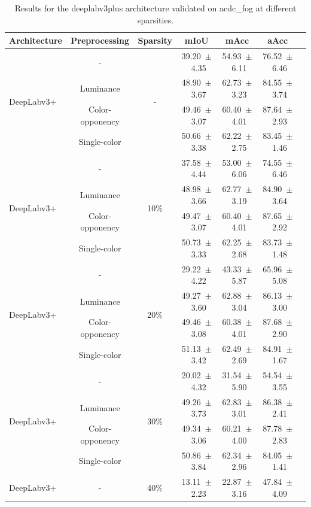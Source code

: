 \begin{table}[h]
\centering
\caption{Results for the deeplabv3plus architecture validated on acdc_fog at different sparsities.}
\begin{tabular}{@{}lccc ccc@{}}
\toprule
Architecture & Preprocessing & Sparsity & mIoU & mAcc & aAcc \\
\midrule

\multirow{4}{*}{DeepLabv3+} & - & \multirow{4}{*}{-} & 39.20~$\pm$~4.35 & 54.93~$\pm$~6.11 & 76.52~$\pm$~6.46 \\
& Luminance & & 48.90~$\pm$~3.67 & 62.73~$\pm$~3.23 & 84.55~$\pm$~3.74 \\
& Color-opponency & & 49.46~$\pm$~3.07 & 60.40~$\pm$~4.01 & 87.64~$\pm$~2.93 \\
& Single-color & & 50.66~$\pm$~3.38 & 62.22~$\pm$~2.75 & 83.45~$\pm$~1.46 \\
\midrule
\multirow{4}{*}{DeepLabv3+} & - & \multirow{4}{*}{10\%} & 37.58~$\pm$~4.44 & 53.00~$\pm$~6.06 & 74.55~$\pm$~6.46 \\
& Luminance & & 48.98~$\pm$~3.66 & 62.77~$\pm$~3.19 & 84.90~$\pm$~3.64 \\
& Color-opponency & & 49.47~$\pm$~3.07 & 60.40~$\pm$~4.01 & 87.65~$\pm$~2.92 \\
& Single-color & & 50.73~$\pm$~3.33 & 62.25~$\pm$~2.68 & 83.73~$\pm$~1.48 \\
\midrule
\multirow{4}{*}{DeepLabv3+} & - & \multirow{4}{*}{20\%} & 29.22~$\pm$~4.22 & 43.33~$\pm$~5.87 & 65.96~$\pm$~5.08 \\
& Luminance & & 49.27~$\pm$~3.60 & 62.88~$\pm$~3.04 & 86.13~$\pm$~3.00 \\
& Color-opponency & & 49.46~$\pm$~3.08 & 60.38~$\pm$~4.01 & 87.68~$\pm$~2.90 \\
& Single-color & & 51.13~$\pm$~3.42 & 62.49~$\pm$~2.69 & 84.91~$\pm$~1.67 \\
\midrule
\multirow{4}{*}{DeepLabv3+} & - & \multirow{4}{*}{30\%} & 20.02~$\pm$~4.32 & 31.54~$\pm$~5.90 & 54.54~$\pm$~3.55 \\
& Luminance & & 49.26~$\pm$~3.73 & 62.83~$\pm$~3.01 & 86.38~$\pm$~2.41 \\
& Color-opponency & & 49.34~$\pm$~3.06 & 60.21~$\pm$~4.00 & 87.78~$\pm$~2.83 \\
& Single-color & & 50.86~$\pm$~3.84 & 62.34~$\pm$~2.96 & 84.05~$\pm$~1.41 \\
\midrule
\multirow{4}{*}{DeepLabv3+} & - & \multirow{4}{*}{40\%} & 13.11~$\pm$~2.23 & 22.87~$\pm$~3.16 & 47.84~$\pm$~4.09 \\

\end{tabular}
\end{table}
